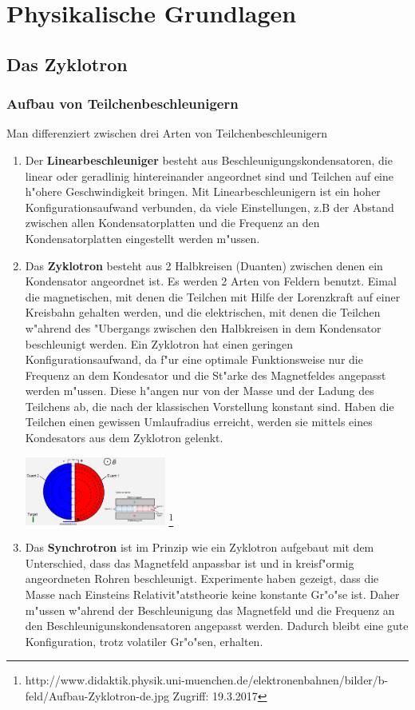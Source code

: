 \documentclass[14pt, a4paper]{report}
\begin{document}
\part{Physikalische Grundlagen}
\chapter{Das Zyklotron}
\section{Aufbau von Teilchenbeschleunigern}
Man differenziert zwischen drei Arten von Teilchenbeschleunigern \footnotemark
{}
\begin{enumerate}
\item
Der \textbf{Linearbeschleuniger} besteht aus Beschleunigungskondensatoren, die linear
oder geradlinig hintereinander angeordnet sind und Teilchen auf 
eine h"ohere Geschwindigkeit bringen. Mit Linearbeschleunigern ist ein hoher
Konfigurationsaufwand verbunden, da viele Einstellungen, z.B der Abstand zwischen allen
Kondensatorplatten und die Frequenz an den Kondensatorplatten eingestellt werden m"ussen.
\item \label{ZyklotronBeschreibungAufbau}
Das \textbf{Zyklotron} besteht aus 2 Halbkreisen (Duanten) zwischen denen ein Kondensator 
angeordnet ist. Es werden 2 Arten von Feldern benutzt. Eimal die magnetischen, mit 
denen die 
Teilchen mit Hilfe der Lorenzkraft auf einer Kreisbahn
gehalten werden, und die elektrischen, 
mit denen die Teilchen w"ahrend des "Ubergangs zwischen den Halbkreisen in dem 
Kondensator beschleunigt werden. Ein Zyklotron hat einen geringen 
Konfigurationsaufwand, da f"ur eine optimale Funktionsweise nur die Frequenz an dem 
Kondesator und die St"arke des Magnetfeldes angepasst werden m"ussen. Diese h"angen nur von der 
Masse und der Ladung des Teilchens ab, die nach der klassischen Vorstellung konstant
sind. Haben die Teilchen einen gewissen Umlaufradius erreicht, werden sie mittels eines 
Kondesators aus dem Zyklotron gelenkt.

\includegraphics[height=85px]{doc/Aufbau-Zyklotron-de.jpg}
\footnote{http://www.didaktik.physik.uni-muenchen.de/elektronenbahnen/bilder/b-feld/Aufbau-Zyklotron-de.jpg Zugriff: 19.3.2017}

\item
Das \textbf{Synchrotron} ist im Prinzip wie ein Zyklotron aufgebaut mit dem 
Unterschied, dass das Magnetfeld anpassbar ist und in kreisf"ormig angeordneten Rohren 
beschleunigt. Experimente haben gezeigt, dass die
Masse nach Einsteins Relativit"atstheorie keine konstante Gr"o"se ist. Daher 
m"ussen w"ahrend der Beschleunigung das Magnetfeld und die Frequenz an den 
Beschleunigunskondensatoren angepasst werden. Dadurch bleibt eine gute 
Konfiguration, trotz  volatiler Gr"o"sen, erhalten. \label{synchrotron}
\end{enumerate}
\end{document}
